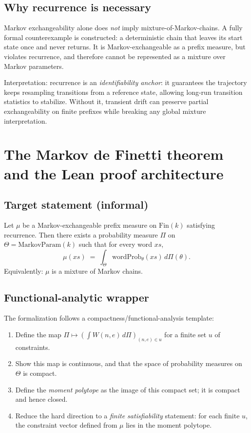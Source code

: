 \documentclass[11pt]{article}
\newcommand{\Fin}{\mathrm{Fin}}
\newcommand{\1}{\mathbf{1}}
\begin{document}
\subsection{Why recurrence is necessary}

Markov exchangeability alone does \emph{not} imply mixture-of-Markov-chains.
A fully formal counterexample is constructed: a deterministic chain that leaves its start state once and never returns.
It is Markov-exchangeable as a prefix measure, but violates recurrence, and therefore cannot be represented as a mixture over Markov parameters.

Interpretation:
recurrence is an \emph{identifiability anchor}: it guarantees the trajectory keeps resampling transitions from a reference state, allowing long-run transition statistics to stabilize.
Without it, transient drift can preserve partial exchangeability on finite prefixes while breaking any global mixture interpretation.

\section{The Markov de Finetti theorem and the Lean proof architecture}

\subsection{Target statement (informal)}

Let $\mu$ be a Markov-exchangeable prefix measure on $\Fin(k)$ satisfying recurrence.
Then there exists a probability measure $\Pi$ on $\Theta=\mathrm{MarkovParam}(k)$ such that for every word $xs$,
\[
\mu(xs) \;=\; \int_{\Theta} \mathrm{wordProb}_\theta(xs)\, d\Pi(\theta).
\]
Equivalently: $\mu$ is a mixture of Markov chains.

\subsection{Functional-analytic wrapper}

The formalization follows a compactness/functional-analysis template:
\begin{enumerate}[leftmargin=2em]
\item Define the map $\Pi \mapsto \left(\int W(n,e)\, d\Pi\right)_{(n,e)\in u}$ for a finite set $u$ of constraints.
\item Show this map is continuous, and that the space of probability measures on $\Theta$ is compact.
\item Define the \emph{moment polytope} as the image of this compact set; it is compact and hence closed.
\item Reduce the hard direction to a \emph{finite satisfiability} statement: for each finite $u$, the constraint vector defined from $\mu$ lies in the moment polytope.
\end{enumerate}
\end{document}
